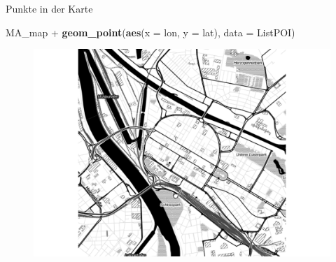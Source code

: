 \documentclass[ignorenonframetext,]{beamer}
\newenvironment{Shaded}{}{}
\newcommand{\KeywordTok}[1]{\textcolor[rgb]{0.00,0.44,0.13}{\textbf{{#1}}}}
\newcommand{\DataTypeTok}[1]{\textcolor[rgb]{0.56,0.13,0.00}{{#1}}}
\newcommand{\NormalTok}[1]{{#1}}
\begin{document}
\begin{frame}[fragile]{Punkte in der Karte}

\begin{Shaded}
\begin{Highlighting}[]
\NormalTok{MA_map +}
\KeywordTok{geom_point}\NormalTok{(}\KeywordTok{aes}\NormalTok{(}\DataTypeTok{x =} \NormalTok{lon, }\DataTypeTok{y =} \NormalTok{lat),}
\DataTypeTok{data =} \NormalTok{ListPOI)}
\end{Highlighting}
\end{Shaded}

\begin{figure}[htbp]
\centering
\includegraphics{RSocialScience2_files/figure-beamer/unnamed-chunk-55-1.pdf}
\caption{}
\end{figure}

\end{frame}
\end{document}
